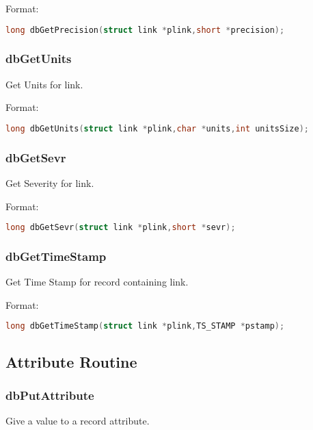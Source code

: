 Format:

\begin{lstlisting}[language=C]
long dbGetPrecision(struct link *plink,short *precision);
\end{lstlisting}

\subsubsection{dbGetUnits}

Get Units for link.

Format:

\begin{lstlisting}[language=C]
long dbGetUnits(struct link *plink,char *units,int unitsSize);
\end{lstlisting}

\subsubsection{dbGetSevr}

Get Severity for link.

Format:

\begin{lstlisting}[language=C]
long dbGetSevr(struct link *plink,short *sevr);
\end{lstlisting}

\subsubsection{dbGetTimeStamp}

Get Time Stamp for record containing link.

Format:

\begin{lstlisting}[language=C]
long dbGetTimeStamp(struct link *plink,TS_STAMP *pstamp);
\end{lstlisting}

\subsection{Attribute Routine}

\subsubsection{dbPutAttribute}

Give a value to a record attribute.

